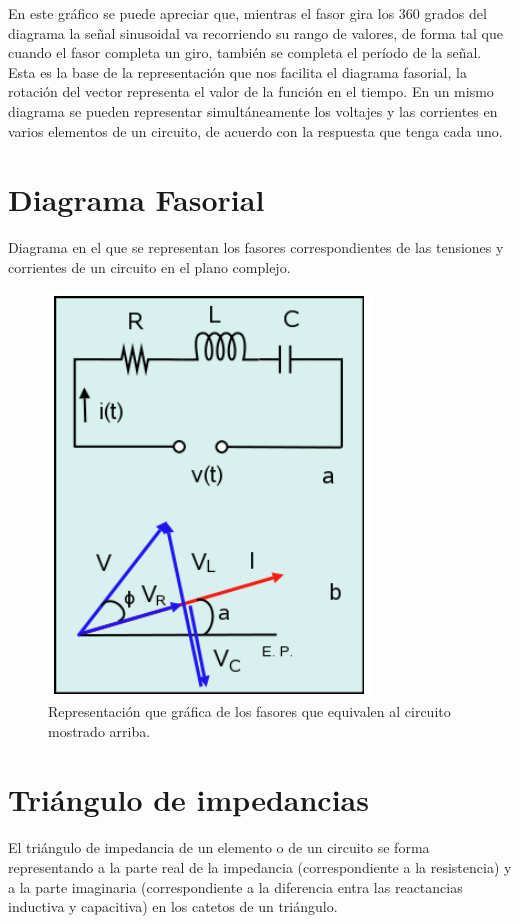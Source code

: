 \documentclass{mylib/reporte}
\begin{document}
En este gráfico se puede apreciar que, mientras el fasor gira los 360 grados del diagrama la señal sinusoidal va recorriendo su rango de valores, de forma tal que cuando el fasor completa un giro, también se completa el período de la señal. Esta es la base de la representación que nos facilita el diagrama fasorial, la rotación del vector representa el valor de la función en el tiempo. En un mismo diagrama se pueden representar simultáneamente los voltajes y las corrientes en varios elementos de un circuito, de acuerdo con la respuesta que tenga cada uno.

\section{Diagrama Fasorial}

Diagrama en el que se representan los fasores correspondientes de las tensiones y  corrientes de un circuito en el plano complejo.

\begin{figure}[H]
	\centering
	\includegraphics[scale=0.5]{img/circ_expo/image9}
	\caption{Representación que gráfica de los fasores que equivalen al circuito mostrado arriba.}
\end{figure}

\section{Triángulo de impedancias}

El triángulo de impedancia de un elemento o de un circuito se forma representando a la parte real de la impedancia (correspondiente a la resistencia) y a la parte imaginaria (correspondiente a la diferencia entra las reactancias inductiva y capacitiva) en los catetos de un triángulo.
\end{document}
